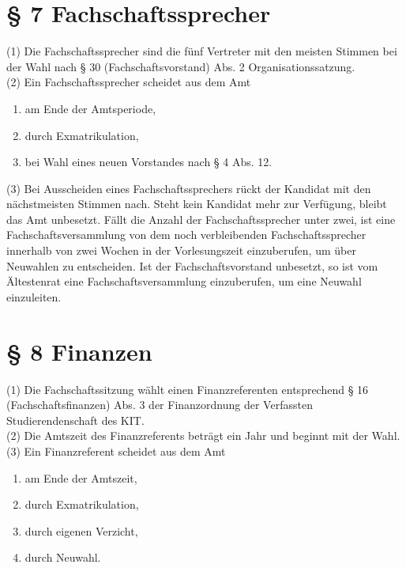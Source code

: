 \documentclass[a4paper, parskip=half, numbers=noenddot]{scrartcl}
\begin{document}
%
%

\section*{§ 7 Fachschaftssprecher}

(1) Die Fachschaftssprecher sind die fünf Vertreter mit den meisten Stimmen bei der Wahl nach § 30 (Fachschaftsvorstand) Abs. 2 Organisationssatzung.\\

(2) Ein Fachschaftssprecher scheidet aus dem Amt
\begin{enumerate}
    \item am Ende der Amtsperiode,
    \item durch Exmatrikulation,
    \item bei Wahl eines neuen Vorstandes nach § 4 Abs. 12.
\end{enumerate}
(3) Bei Ausscheiden eines Fachschaftssprechers rückt der Kandidat mit den nächstmeisten
Stimmen nach. Steht kein Kandidat mehr zur Verfügung, bleibt das Amt unbesetzt. Fällt die
Anzahl der Fachschaftssprecher unter zwei, ist eine Fachschaftsversammlung von dem noch
verbleibenden Fachschaftssprecher innerhalb von zwei Wochen in der Vorlesungszeit einzuberufen, um über Neuwahlen zu entscheiden. Ist der Fachschaftsvorstand unbesetzt, so ist vom Ältestenrat eine Fachschaftsversammlung einzuberufen, um eine Neuwahl einzuleiten.


%
%

\section*{§ 8 Finanzen}

(1) Die Fachschaftssitzung wählt einen Finanzreferenten entsprechend § 16 (Fachschaftsfinanzen) Abs. 3 der Finanzordnung der Verfassten Studierendenschaft des KIT.\\

(2) Die Amtszeit des Finanzreferents beträgt ein Jahr und beginnt mit der Wahl.\\

(3) Ein Finanzreferent scheidet aus dem Amt
\begin{enumerate}
    \item am Ende der Amtszeit,
    \item durch Exmatrikulation,
    \item durch eigenen Verzicht,
    \item durch Neuwahl.
\end{enumerate}
\end{document}
